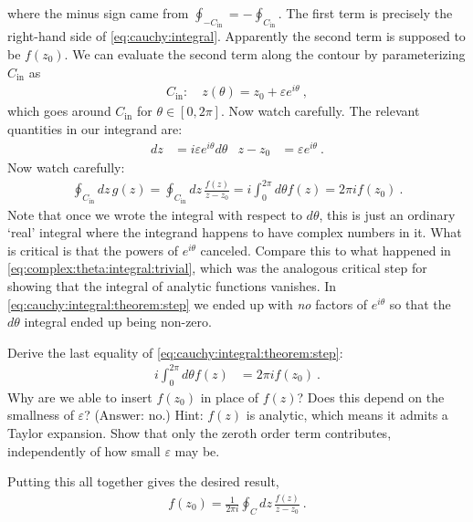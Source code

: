 where the minus sign came from $\oint_{-C_\text{in}} = - \oint_{C_\text{in}}$. The first term is precisely the right-hand side of \eqref{eq:cauchy:integral}. Apparently the second term is supposed to be $f(z_0)$. We can evaluate the second term along the contour by parameterizing $C_\text{in}$ as
\begin{align}
	C_\text{in}: \quad z(\theta) = z_0 + \varepsilon e^{i\theta} \ ,
\end{align}
which goes around $C_\text{in}$ for $\theta \in [0,2\pi]$. Now watch carefully. The relevant quantities in our integrand are:
\begin{align}
	dz &= i\varepsilon e^{i\theta} d\theta 
	&
	z-z_0 &= \varepsilon e^{i\theta} \ .
\end{align}
Now watch carefully: 
\begin{align}
	\oint_{C_\text{in}} dz\, g(z)
	=
	\oint_{C_\text{in}} dz\, \frac{f(z)}{z-z_0}
	= 
	i\int_0^{2\pi} d\theta f(z) 
	= 2\pi i f(z_0) \ . 
	\label{eq:cauchy:integral:theorem:step}
\end{align}
Note that once we wrote the integral with respect to $d\theta$, this is just an ordinary `real' integral where the integrand happens to have complex numbers in it. What is critical is that the powers of $e^{i\theta}$ canceled. Compare this to what happened in \eqref{eq:complex:theta:integral:trivial}, which was the analogous critical step for showing that the integral of analytic functions vanishes. In \eqref{eq:cauchy:integral:theorem:step} we ended up with \emph{no} factors of $e^{i\theta}$ so that the $d\theta$ integral ended up being non-zero. 
\begin{exercise}
Derive the last equality of \eqref{eq:cauchy:integral:theorem:step}:
\begin{align}
	i\int_0^{2\pi} d\theta f(z) 
	&= 2\pi i f(z_0) \ .
\end{align}
Why are we able to insert $f(z_0)$ in place of $f(z)$? Does this depend on the smallness of $\varepsilon$? (Answer: no.) {Hint}: $f(z)$ is analytic, which means it admits a Taylor expansion. Show that only the zeroth order term contributes, independently of how small $\varepsilon$ may be.
\end{exercise}

Putting this all together gives the desired result,
\begin{align}
	f(z_0) = \frac{1}{2\pi i}\oint_C dz\, \frac{f(z)}{z-z_0} \ .
	\label{eq:cauchy:integral:theorem}
\end{align}

